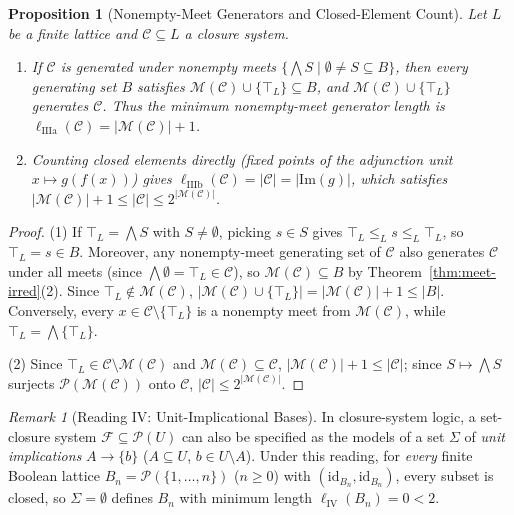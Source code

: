 \documentclass[11pt,a4paper]{article}
\newtheorem{proposition}[theorem]{Proposition}
\theoremstyle{definition}
\theoremstyle{remark}
\newtheorem{remark}[theorem]{Remark}
\begin{document}
\begin{proposition}[Nonempty-Meet Generators and Closed-Element Count]\label{prop:reading-iii}
Let $L$ be a finite lattice and $\mathcal{C} \subseteq L$ a closure system.
\begin{enumerate}
\item If $\mathcal{C}$ is generated under \emph{nonempty} meets $\{ \bigwedge S \mid \emptyset \neq S \subseteq B \}$, then every generating set $B$ satisfies $\mathcal{M}(\mathcal{C}) \cup \{\top_L\} \subseteq B$, and $\mathcal{M}(\mathcal{C}) \cup \{\top_L\}$ generates $\mathcal{C}$. Thus the minimum nonempty-meet generator length is $\ell_{\mathrm{IIIa}}(\mathcal{C}) = |\mathcal{M}(\mathcal{C})| + 1$.
\item Counting closed elements directly (fixed points of the adjunction unit $x \mapsto g(f(x))$) gives $\ell_{\mathrm{IIIb}}(\mathcal{C}) = |\mathcal{C}| = |\mathrm{Im}(g)|$, which satisfies $|\mathcal{M}(\mathcal{C})| + 1 \le |\mathcal{C}| \le 2^{|\mathcal{M}(\mathcal{C})|}$.
\end{enumerate}
\end{proposition}

\begin{proof}
(1) If $\top_L = \bigwedge S$ with $S \neq \emptyset$, picking $s \in S$ gives $\top_L \le_L s \le_L \top_L$, so $\top_L = s \in B$. Moreover, any nonempty-meet generating set of $\mathcal{C}$ also generates $\mathcal{C}$ under all meets (since $\bigwedge \emptyset = \top_L \in \mathcal{C}$), so $\mathcal{M}(\mathcal{C}) \subseteq B$ by Theorem~\ref{thm:meet-irred}(2). Since $\top_L \notin \mathcal{M}(\mathcal{C})$, $|\mathcal{M}(\mathcal{C}) \cup \{\top_L\}| = |\mathcal{M}(\mathcal{C})| + 1 \le |B|$. Conversely, every $x \in \mathcal{C} \setminus \{\top_L\}$ is a nonempty meet from $\mathcal{M}(\mathcal{C})$, while $\top_L = \bigwedge \{\top_L\}$.

(2) Since $\top_L \in \mathcal{C} \setminus \mathcal{M}(\mathcal{C})$ and $\mathcal{M}(\mathcal{C}) \subseteq \mathcal{C}$, $|\mathcal{M}(\mathcal{C})| + 1 \le |\mathcal{C}|$; since $S \mapsto \bigwedge S$ surjects $\mathcal{P}(\mathcal{M}(\mathcal{C}))$ onto $\mathcal{C}$, $|\mathcal{C}| \le 2^{|\mathcal{M}(\mathcal{C})|}$.
\end{proof}

\begin{remark}[Reading IV: Unit-Implicational Bases]\label{rem:reading-iv}
In closure-system logic, a set-closure system $\mathcal{F} \subseteq \mathcal{P}(U)$ can also be specified as the models of a set $\Sigma$ of \emph{unit implications} $A \to \{b\}$ ($A \subseteq U$, $b \in U \setminus A$). Under this reading, for \emph{every} finite Boolean lattice $B_n = \mathcal{P}(\{1, \dots, n\})$ ($n \ge 0$) with $(\mathrm{id}_{B_n}, \mathrm{id}_{B_n})$, every subset is closed, so $\Sigma = \emptyset$ defines $B_n$ with minimum length $\ell_{\mathrm{IV}}(B_n) = 0 < 2$.
\end{remark}
\end{document}
